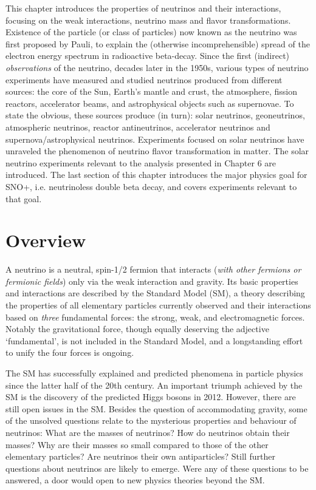 This chapter introduces the properties of neutrinos and their interactions, focusing on the weak interactions, neutrino mass and flavor transformations. Existence of the particle (or class of particles) now known as the neutrino was first proposed by Pauli, to explain the (otherwise incomprehensible) spread of the electron energy spectrum in radioactive beta-decay. Since the first (indirect) {\em observations} of the neutrino, decades later in the 1950s, various types of neutrino experiments have measured and studied neutrinos produced from different sources: the core of the Sun, Earth's mantle and crust, the atmosphere, fission reactors, accelerator beams, and astrophysical objects such as supernovae. To state the obvious, these sources produce (in turn): solar neutrinos, geoneutrinos, atmospheric neutrinos, reactor antineutrinos, accelerator neutrinos and supernova/astrophysical neutrinos. Experiments focused on solar neutrinos have unraveled the phenomenon of neutrino flavor transformation in matter. The solar neutrino experiments relevant to the analysis presented in Chapter 6 are introduced. The last section of this chapter introduces the major physics goal for SNO+, i.e. neutrinoless double beta decay, and covers experiments relevant to that goal.

\section{Overview}

A neutrino is a neutral, spin-1/2 fermion that interacts ({\em with other fermions or fermionic fields}) only via the weak interaction and gravity. Its basic properties and interactions are described by the Standard Model (SM), a theory describing the properties of all elementary particles currently observed and their interactions based on {\em three} fundamental forces: the strong, weak, and electromagnetic forces. Notably the gravitational force, though equally deserving the adjective `fundamental', is not included in the Standard Model, and a longstanding effort to unify the four forces is ongoing. 

The SM has successfully explained and predicted phenomena in particle physics since the latter half of the 20th century. An important triumph achieved by the SM is the discovery of the predicted Higgs bosons in 2012. However, there are still open issues in the SM. Besides the question of accommodating gravity, some of the unsolved questions relate to the mysterious properties and behaviour of neutrinos: What are the masses of neutrinos? How do neutrinos obtain their masses? Why are their masses so small compared to those of the other elementary particles? Are neutrinos their own antiparticles? Still further questions about neutrinos are likely to emerge. Were any of these questions to be answered, a door would open to new physics theories beyond the SM.

